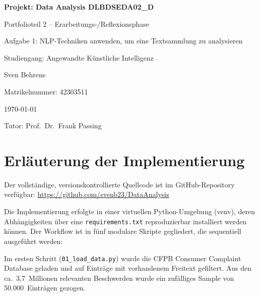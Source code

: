 \documentclass[a4paper,11pt]{article}
\begin{document}
\begin{titlepage}
    \thispagestyle{empty}
    \centering
    \vspace*{5cm}
    {\Huge\bfseries Projekt: Data Analysis DLBDSEDA02\_D \par}
    \vspace{1cm}
    {\Large Portfolioteil 2 -- Erarbeitungs-/Reflexionsphase \par}
    \vspace{0.3cm}
    {\large Aufgabe 1: NLP-Techniken anwenden, um eine Textsammlung zu analysieren \par}
    \vspace{0.5cm}
    {\large Studiengang: Angewandte Künstliche Intelligenz \par}
    \vspace{0.5cm}
    {\large Sven Behrens \par}
    \vspace{0.5cm}
    {\large Matrikelnummer: 42303511 \par}
    \vspace{0.5cm}
    {\large \today \par}
    \vspace{0.5cm}
    {\large Tutor: Prof.~Dr.~Frank Passing \par}
\end{titlepage}

\setcounter{page}{1}

\section{Erläuterung der Implementierung}

Der vollständige, versionskontrollierte Quellcode ist im GitHub-Repository verfügbar:
\url{https://github.com/svenb23/DataAnalysis}

Die Implementierung erfolgte in einer virtuellen Python-Umgebung (venv), deren Abhängigkeiten
über eine \texttt{requirements.txt} reproduzierbar installiert werden können. Der Workflow ist
in fünf modulare Skripte gegliedert, die sequentiell ausgeführt werden:

Im ersten Schritt (\texttt{01\_load\_data.py}) wurde die CFPB Consumer Complaint Database \parencite{cfpb2024} geladen
und auf Einträge mit vorhandenem Freitext gefiltert. Aus den ca.~3,7~Millionen relevanten
Beschwerden wurde ein zufälliges Sample von 50.000~Einträgen gezogen.
\end{document}
